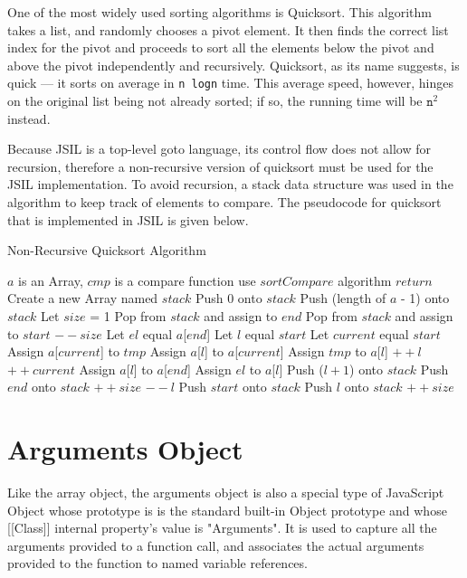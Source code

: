 \documentclass[a4paper,11pt,twoside]{report}
\begin{document}
One of the most widely used sorting algorithms is Quicksort. This algorithm takes a list, and randomly chooses a pivot element. It then finds the correct list index for the pivot and proceeds to sort all the elements below the pivot and above the pivot independently and recursively. Quicksort, as its name suggests, is quick --- it sorts on average in \texttt{n logn} time. This average speed, however, hinges on the original list being not already sorted; if so, the running time will be $\mathtt{n}^2$ instead.

Because JSIL is a top-level goto language, its control flow does not allow for recursion, therefore a non-recursive version of quicksort must be used for the JSIL implementation. To avoid recursion, a stack data structure was used in the algorithm to keep track of elements to compare. The pseudocode for quicksort that is implemented in JSIL is given below.

\begin{algorithm}
\caption{Non-Recursive Quicksort Algorithm}
\begin{algorithmic}
\REQUIRE $a$ is an Array, $cmp$ is a compare function
\STATE use $sortCompare$ algorithm
\ENDIF
{}
\STATE $return$
\ENDIF
\STATE Create a new Array named $stack$
\STATE Push 0 onto $stack$
\STATE Push (length of $a$ - 1) onto $stack$
\STATE Let $size$ = 1
\STATE Pop from $stack$ and assign to $end$
\STATE Pop from $stack$ and assign to $start$
\STATE $--size$
\STATE Let $el$ equal $a$[$end$]
\STATE Let $l$ equal $start$
\STATE Let $current$ equal $start$
\STATE Assign $a$[$current$] to $tmp$
\STATE Assign $a$[$l$] to $a$[$current$]
\STATE Assign $tmp$ to $a$[$l$]
\STATE $++l$
\ENDIF
\STATE $++current$
\ENDWHILE
\STATE Assign $a$[$l$] to $a$[$end$]
\STATE Assign $el$ to $a$[$l$]
\STATE Push ($l + 1$) onto $stack$
\STATE Push $end$ onto $stack$
\STATE $++size$
\ENDIF
\STATE $--l$
\STATE Push $start$ onto $stack$
\STATE Push $l$ onto $stack$
\STATE $++size$
\ENDIF
\ENDWHILE
\end{algorithmic}
\end{algorithm}


\chapter{Arguments Object}\label{sec:argobj}
Like the array object, the arguments object is also a special type of JavaScript Object whose prototype is is the standard built-in Object prototype and whose [[Class]] internal property's value is "Arguments". It is used to capture all the arguments provided to a function call, and associates the actual arguments provided to the function to named variable references. 
\end{document}
